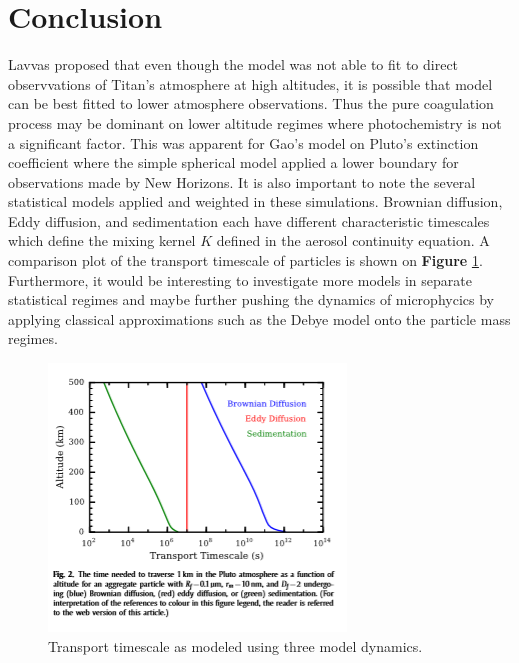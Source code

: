 \documentclass[useAMS,natbib]{mn2e}
\begin{document}
\section{Conclusion}
Lavvas proposed that even though the model was not able to fit to direct observvations of Titan's atmosphere at high altitudes, it is possible that model can be best fitted to lower atmosphere observations. Thus the pure coagulation process may be dominant on lower altitude regimes where photochemistry is not a significant factor. This was apparent for Gao's model on Pluto's extinction coefficient where the simple spherical model applied a lower boundary for observations made by New Horizons. It is also important to note the several statistical models applied and weighted in these simulations. Brownian diffusion, Eddy diffusion, and sedimentation each have different characteristic timescales which define the mixing kernel $K$ defined in the aerosol continuity equation. A comparison plot of the transport timescale of particles is shown on \textbf{Figure} \ref{timescale}. Furthermore, it would be interesting to investigate more models in separate statistical regimes and maybe further pushing the dynamics of microphycics by applying classical approximations such as the Debye model onto the particle mass regimes.
\begin{figure}
\includegraphics[scale = 1.0]{plt_timescale}
\caption{Transport timescale as modeled using three model dynamics.}
\label{timescale}
\end{figure}

%

%
%
\end{document}
